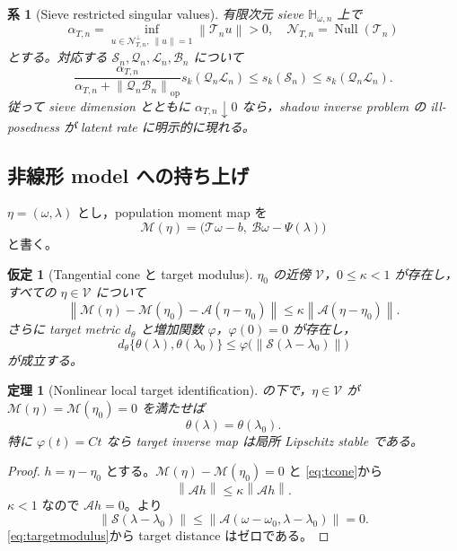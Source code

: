 \documentclass[11pt,a4paper]{ltjsarticle}
\newtheorem{assumption}{仮定}[section]
\newtheorem{theorem}{定理}[section]
\newtheorem{corollary}{系}[section]
\theoremstyle{remark}
\newcommand{\norm}[1]{\left\lVert#1\right\rVert}
\newcommand{\cN}{\mathcal N}
\newcommand{\cV}{\mathcal V}
\newcommand{\Mop}{\mathscr M}
\newcommand{\Aop}{\mathscr A}
\newcommand{\Top}{\mathscr T}
\newcommand{\Bop}{\mathscr B}
\newcommand{\Lop}{\mathscr L}
\newcommand{\Sop}{\mathscr S}
\newcommand{\Qop}{\mathscr Q}
\newcommand{\Null}{\operatorname{Null}}
\newcommand{\op}{\operatorname{op}}
\begin{document}
\begin{corollary}[Sieve restricted singular values]\label{cor:sievesv}
有限次元 sieve $\mathbb H_{\omega,n}$ 上で
\[
\alpha_{T,n}
=\inf_{u\in\cN_{T,n}^\perp,\ \norm u=1}\norm{\Top_nu}>0,
\quad
\cN_{T,n}=\Null(\Top_n)
\]
とする。対応する $\Sop_n,\Qop_n,\Lop_n,\Bop_n$ について
\[
\frac{\alpha_{T,n}}{\alpha_{T,n}+\norm{\Qop_n\Bop_n}_{\op}}
 s_k(\Qop_n\Lop_n)
\le s_k(\Sop_n)
\le s_k(\Qop_n\Lop_n).
\]
従って sieve dimension とともに $\alpha_{T,n}\downarrow0$ なら，shadow inverse problem の ill-posedness が latent rate に明示的に現れる。
\end{corollary}

\subsection{非線形 model への持ち上げ}
$\eta=(\omega,\lambda)$ とし，population moment map を
\[
\Mop(\eta)=\bigl(\Top\omega-b,\ \Bop\omega-\Psi(\lambda)\bigr)
\]
と書く。

\begin{assumption}[Tangential cone と target modulus]\label{as:nonlinear}
$\eta_0$ の近傍 $\cV$，$0\le\kappa<1$ が存在し，すべての $\eta\in\cV$ について
\begin{equation}
\norm{\Mop(\eta)-\Mop(\eta_0)-\Aop(\eta-\eta_0)}
\le\kappa\norm{\Aop(\eta-\eta_0)}.
\label{eq:tcone}
\end{equation}
さらに target metric $d_\theta$ と増加関数 $\varphi$，$\varphi(0)=0$ が存在し，
\begin{equation}
 d_\theta\{\theta(\lambda),\theta(\lambda_0)\}
\le\varphi\bigl(\norm{\Sop(\lambda-\lambda_0)}\bigr)
\label{eq:targetmodulus}
\end{equation}
が成立する。
\end{assumption}

\begin{theorem}[Nonlinear local target identification]\label{thm:nonlinearid}
の下で，$\eta\in\cV$ が $\Mop(\eta)=\Mop(\eta_0)=0$ を満たせば
\[
\theta(\lambda)=\theta(\lambda_0).
\]
特に $\varphi(t)=Ct$ なら target inverse map は局所 Lipschitz stable である。
\end{theorem}

\begin{proof}
$h=\eta-\eta_0$ とする。$\Mop(\eta)-\Mop(\eta_0)=0$ と \eqref{eq:tcone}から
\[
\norm{\Aop h}
\le\kappa\norm{\Aop h}.
\]
$\kappa<1$ なので $\Aop h=0$。より
\[
\norm{\Sop(\lambda-\lambda_0)}
\le\norm{\Aop(\omega-\omega_0,\lambda-\lambda_0)}=0.
\]
\eqref{eq:targetmodulus}から target distance はゼロである。
\end{proof}
\end{document}
